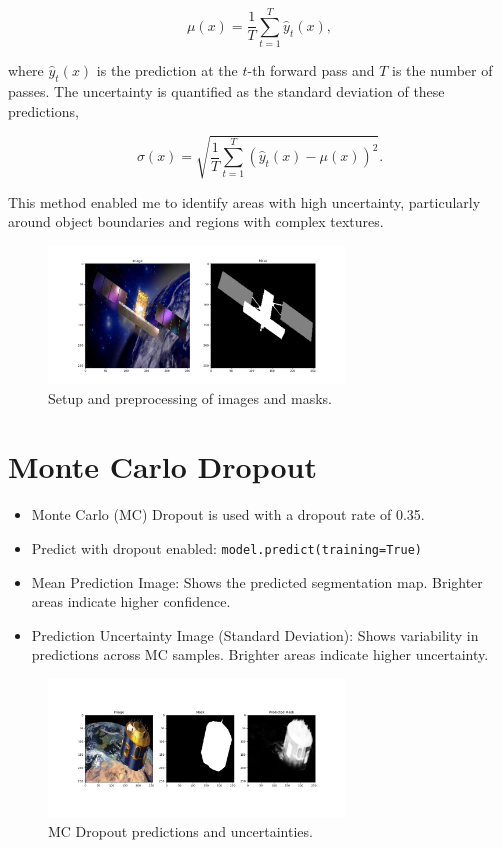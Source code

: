 \documentclass{article}
\begin{document}
\[
\mu(x) = \frac{1}{T} \sum_{t=1}^{T} \hat{y}_t(x),
\]

where \( \hat{y}_t(x) \) is the prediction at the \( t \)-th forward pass and \( T \) is the number of 
passes. The uncertainty is quantified as the standard 
deviation of these predictions,

\[
\sigma(x) = \sqrt{\frac{1}{T} \sum_{t=1}^{T} (\hat{y}_t(x) - \mu(x))^2}.
\]

This method enabled me to identify areas with high uncertainty, particularly around object boundaries 
and regions with complex textures.



\begin{figure}[h]
    \centering
    \includegraphics[width=0.7\textwidth]{../images/processed_input_sample.png}
    \caption{Setup and preprocessing of images and masks.}
    \label{fig:setup}
\end{figure}

\section{Monte Carlo Dropout}
\begin{itemize}
    \item Monte Carlo (MC) Dropout is used with a dropout rate of 0.35.
    \item Predict with dropout enabled: \texttt{model.predict(training=True)}
    \item Mean Prediction Image: Shows the predicted segmentation map. Brighter areas indicate higher confidence.
    \item Prediction Uncertainty Image (Standard Deviation): Shows variability in predictions across MC samples. Brighter areas indicate higher uncertainty.
\end{itemize}

\begin{figure}[h]
    \centering
    \includegraphics[width=0.7\textwidth]{../images/output_sample.png}
    \caption{MC Dropout predictions and uncertainties.}
    \label{fig:mc_dropout}
\end{figure}
\end{document}
